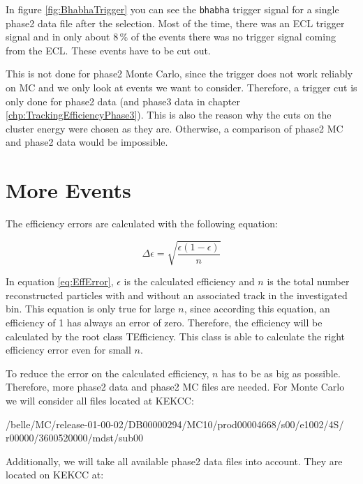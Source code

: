 \documentclass[a4paper,11pt,twosided,final,german,openbib,pdftex,listof=totoc,bibliography=totoc]{scrbook}
\begin{document}
In figure \ref{fig:BhabhaTrigger} you can see the \texttt{bhabha} trigger signal for a single phase2 data file after the selection. Most of the time, there was an ECL trigger signal and in only about $8\,\%$ of the events there was no trigger signal coming from the ECL. These events have to be cut out.

This is not done for phase2 Monte Carlo, since the trigger does not work reliably on MC and we only look at events we want to consider. Therefore, a trigger cut is only done for phase2 data (and phase3 data in chapter \ref{chp:TrackingEfficiencyPhase3}). This is also the reason why the cuts on the cluster energy were chosen as they are. Otherwise, a comparison of phase2 MC and phase2 data would be impossible.

\section{More Events}
\label{sec:Phase2MoreEvents}





The efficiency errors are calculated with the following equation:

\begin{equation}
\Delta \epsilon = \sqrt{\frac{\epsilon(1-\epsilon)}{n}}
\label{eq:EffError}
\end{equation}

In equation \ref{eq:EffError}, $\epsilon$ is the calculated efficiency and $n$ is the total number reconstructed particles with and without an associated track in the investigated bin. This equation is only true for large $n$, since according this equation, an efficiency of 1 has always an error of zero. Therefore, the efficiency will be calculated by the root class TEfficiency. This class is able to calculate the right efficiency error even for small $n$. \cite{TEfficiency}



To reduce the error on the calculated efficiency, $n$ has to be as big as possible. Therefore, more phase2 data and phase2 MC files are needed. For Monte Carlo we will consider all files located at KEKCC: 
\newline

/belle/MC/release-01-00-02/DB00000294/MC10/prod00004668/s00/e1002/4S/
r00000/3600520000/mdst/sub00
\newline

Additionally, we will take all available phase2 data files into account. They are located on KEKCC at:
\newline
\end{document}
